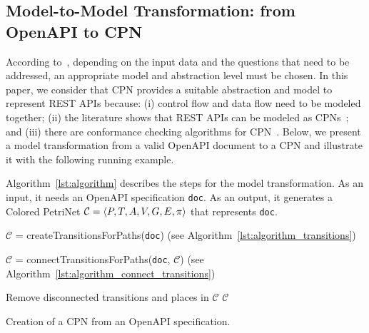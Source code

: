 \subsection{Model-to-Model Transformation: from OpenAPI to CPN}
\label{sec:transformation}

According to~\cite{vanderAalst2016}, depending on the input data and the questions that need to be addressed, an appropriate model and abstraction level must be chosen. In this paper, we consider that CPN provides a suitable abstraction and model to represent REST APIs because: (i) control flow and data flow need to be modeled together; (ii) the literature shows that REST APIs can be modeled as CPNs~\cite{decker2008restful, li2011design, li2015designing}; and (iii) there are conformance checking algorithms for CPN~\cite{carrasquel2020checking}. Below, we present a model transformation from a valid OpenAPI document to a CPN and illustrate it with the following running example.

%
%
Algorithm~\ref{lst:algorithm} describes the steps for the model transformation. As an input, it needs an OpenAPI specification {\tt doc}. As an output, it generates a Colored PetriNet $\mathcal{C}=\langle{P,T,A,V,G,E,\pi}\rangle$ that represents {\tt doc}. %


\begin{algorithm}

$\mathcal{C}$ = createTransitionsForPaths({\tt doc}) (see Algorithm~\ref{lst:algorithm_transitions})\;

$\mathcal{C}$ = connectTransitionsForPaths({\tt doc}, $\mathcal{C}$) (see Algorithm~\ref{lst:algorithm_connect_transitions})\;

Remove disconnected transitions and places in $\mathcal{C}$\;
\Return  $\mathcal{C}$\;

\caption{Creation of a CPN from an OpenAPI specification.}
\label{lst:algorithm}
\end{algorithm}


